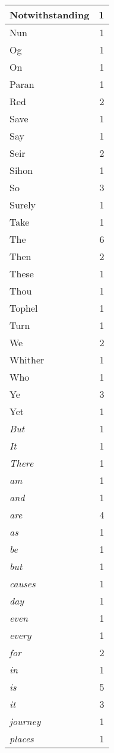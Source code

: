 \begin{center}
\begin{longtable}{l|r}
Notwithstanding & 1 \\ \hline
Nun & 1 \\ \hline
Og & 1 \\ \hline
On & 1 \\ \hline
Paran & 1 \\ \hline
Red & 2 \\ \hline
Save & 1 \\ \hline
Say & 1 \\ \hline
Seir & 2 \\ \hline
Sihon & 1 \\ \hline
So & 3 \\ \hline
Surely & 1 \\ \hline
Take & 1 \\ \hline
The & 6 \\ \hline
Then & 2 \\ \hline
These & 1 \\ \hline
Thou & 1 \\ \hline
Tophel & 1 \\ \hline
Turn & 1 \\ \hline
We & 2 \\ \hline
Whither & 1 \\ \hline
Who & 1 \\ \hline
Ye & 3 \\ \hline
Yet & 1 \\ \hline
\emph{But} & 1 \\ \hline
\emph{It} & 1 \\ \hline
\emph{There} & 1 \\ \hline
\emph{am} & 1 \\ \hline
\emph{and} & 1 \\ \hline
\emph{are} & 4 \\ \hline
\emph{as} & 1 \\ \hline
\emph{be} & 1 \\ \hline
\emph{but} & 1 \\ \hline
\emph{causes} & 1 \\ \hline
\emph{day} & 1 \\ \hline
\emph{even} & 1 \\ \hline
\emph{every} & 1 \\ \hline
\emph{for} & 2 \\ \hline
\emph{in} & 1 \\ \hline
\emph{is} & 5 \\ \hline
\emph{it} & 3 \\ \hline
\emph{journey} & 1 \\ \hline
\emph{places} & 1 \\ \hline

\end{longtable}
\end{center}
